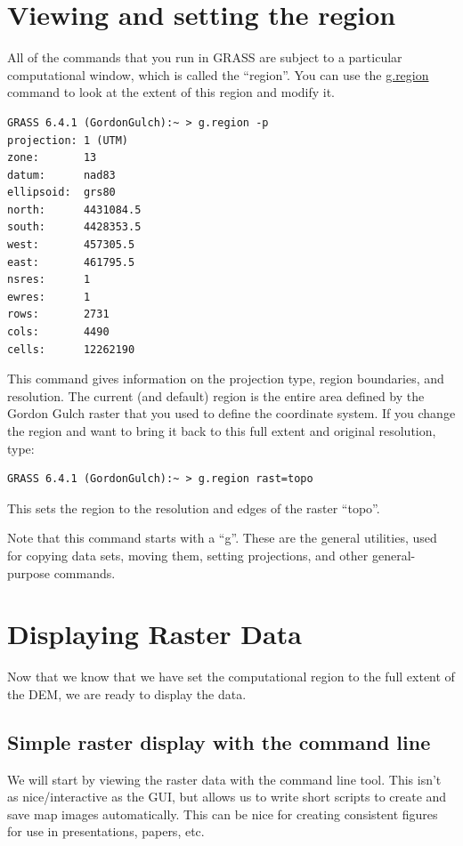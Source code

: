 \documentclass{book}
\begin{document}
\section{Viewing and setting the region}

All of the commands that you run in GRASS are subject to a particular computational window, which is called the ``region''. You can use the \url{g.region} command to look at the extent of this region and modify it.
\begin{lstlisting}
GRASS 6.4.1 (GordonGulch):~ > g.region -p
projection: 1 (UTM)
zone:       13
datum:      nad83
ellipsoid:  grs80
north:      4431084.5
south:      4428353.5
west:       457305.5
east:       461795.5
nsres:      1
ewres:      1
rows:       2731
cols:       4490
cells:      12262190
\end{lstlisting}
This command gives information on the projection type, region boundaries, and resolution. The current (and default) region is the entire area defined by the Gordon Gulch raster that you used to define the coordinate system. If you change the region and want to bring it back to this full extent and original resolution, type:
\begin{lstlisting}
GRASS 6.4.1 (GordonGulch):~ > g.region rast=topo
\end{lstlisting}
This sets the region to the resolution and edges of the raster ``topo''.

Note that this command starts with a ``g''. These are the general utilities, used for copying data sets, moving them, setting projections, and other general-purpose commands.


\section{Displaying Raster Data}

Now that we know that we have set the computational region to the full extent of the DEM, we are ready to display the data.

\subsection{Simple raster display with the command line}

We will start by viewing the raster data with the command line tool. This isn't as nice/interactive as the GUI, but allows us to write short scripts to create and save map images automatically. This can be nice for creating consistent figures for use in presentations, papers, etc.
\end{document}
